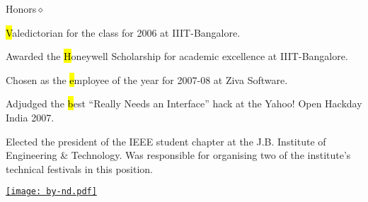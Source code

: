 \documentclass{resume}
\begin{document}
\begin{category}{Honors}{$\diamond$}

    \item {\hl Valedictorian} for the class for 2006 at IIIT-Bangalore.

    \item Awarded the {\hl Honeywell Scholarship} for academic excellence
        at IIIT-Bangalore.

    \item Chosen as the {\hl employee of the year} for 2007-08 at Ziva
        Software.

    \item Adjudged the {\hl best ``Really Needs an Interface''} hack at the
        Yahoo! Open Hackday India 2007.

    \item Elected the president of the IEEE student chapter at the J.B. Institute
        of Engineering \& Technology. Was responsible for organising two of the
        institute's technical festivals in this position.
\end{category}


\begin{center}
    \href{http://creativecommons.org/licenses/by-nd/2.5/in}{%
        \texttt{[image: by-nd.pdf]}
        }
\end{center}
\end{document}
